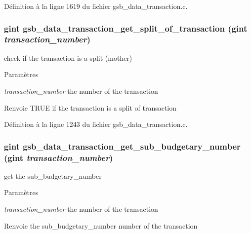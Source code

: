 Définition à la ligne 1619 du fichier gsb\_\-data\_\-transaction.c.

\subsubsection[{gsb\_\-data\_\-transaction\_\-get\_\-split\_\-of\_\-transaction}]{\setlength{\rightskip}{0pt plus 5cm}gint gsb\_\-data\_\-transaction\_\-get\_\-split\_\-of\_\-transaction (gint {\em transaction\_\-number})}\label{gsb__data__transaction_8c_a2de1ba38ee196b44e3c00c10e1d645cc}
check if the transaction is a split (mother)


\begin{DoxyParams}{Paramètres}
\item[{\em transaction\_\-number}]the number of the transaction\end{DoxyParams}
\begin{DoxyReturn}{Renvoie}
TRUE if the transaction is a split of transaction 
\end{DoxyReturn}


Définition à la ligne 1243 du fichier gsb\_\-data\_\-transaction.c.

\subsubsection[{gsb\_\-data\_\-transaction\_\-get\_\-sub\_\-budgetary\_\-number}]{\setlength{\rightskip}{0pt plus 5cm}gint gsb\_\-data\_\-transaction\_\-get\_\-sub\_\-budgetary\_\-number (gint {\em transaction\_\-number})}\label{gsb__data__transaction_8c_a44dbcf1f953a233d0038027289aa2372}
get the sub\_\-budgetary\_\-number 
\begin{DoxyParams}{Paramètres}
\item[{\em transaction\_\-number}]the number of the transaction \end{DoxyParams}
\begin{DoxyReturn}{Renvoie}
the sub\_\-budgetary\_\-number number of the transaction 
\end{DoxyReturn}


